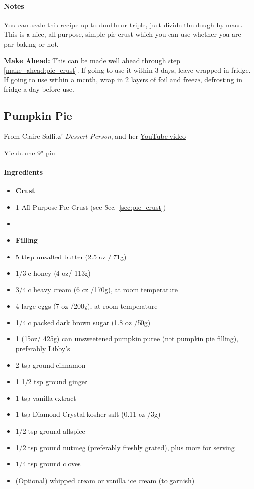 \documentclass[12pt]{article}
\newcommand{\TODO}{[\textcolor{red}{XXX}]}
\newenvironment*{ingredients}
	{
		\paragraph*{Ingredients}
		\begin{itemize}
	}
	{
		\end{itemize}
	}
\newenvironment*{notes}
	{
		\paragraph*{Notes}
		\begin{adjustwidth}{1cm}{}
	}
	{
		\end{adjustwidth}
	}
\begin{document}
	\begin{notes}
		You can scale this recipe up to double or triple, just divide the dough by mass. This is a nice, all-purpose, simple pie crust which you can use whether you are par-baking or not.
		
		\textbf{Make Ahead:} This can be made well ahead through step \ref{make_ahead:pie_crust}. If going to use it within 3 days, leave wrapped in fridge. If going to use within a month, wrap in 2 layers of foil and freeze, defrosting in fridge a day before use.
	\end{notes}
	
	\newpage
	
%	
%	
%	
	
	\subsection{Pumpkin Pie}
	From Claire Saffitz' \textit{Dessert Person}, and her \href{https://www.youtube.com/watch?v=vT4Kk9v3B5Y}{YouTube video}
	
	Yields one 9" pie
	
	\begin{ingredients}
		\item[] \textbf{Crust}
		\item 1 All-Purpose Pie Crust (see Sec.~\ref{sec:pie_crust})
		\item[] \hfill
		\item[] \textbf{Filling}
		\item 5 tbsp unsalted butter (2.5 oz / 71g) 
		\item 1/3 c honey (4 oz/ 113g)
		\item 3/4 c heavy cream (6 oz /170g), at room temperature
		\item 4 large eggs (7 oz /200g), at room temperature
		\item 1/4 c packed dark brown sugar (1.8 oz /50g)
		\item 1 (15oz/ 425g) can unsweetened pumpkin puree (not pumpkin pie filling), preferably Libby's
		\item 2 tsp ground cinnamon
		\item 1 1/2 tsp ground ginger
		\item 1 tsp vanilla extract
		\item 1 tsp Diamond Crystal kosher salt (0.11 oz /3g)
		\item 1/2 tsp ground allspice
		\item 1/2 tsp ground nutmeg (preferably freshly grated), plus more for serving
		\item 1/4 tsp ground cloves
		\item (Optional) whipped cream or vanilla ice cream (to garnish)
	\end{ingredients}
	
\end{document}
